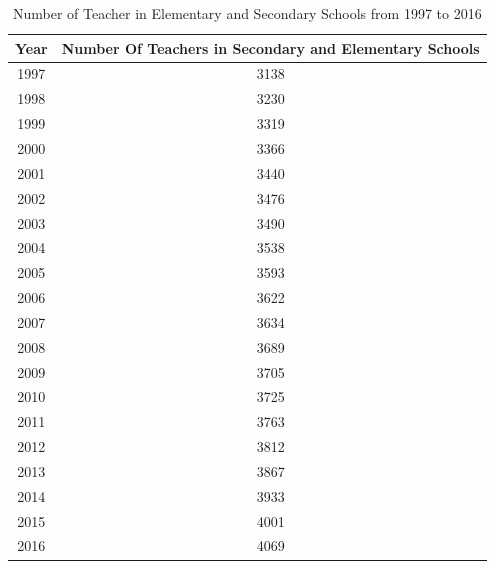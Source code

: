 \documentclass[thesis=B,english]{FITthesis}[2012/10/20]
\begin{document}
\newpage
\begin{table}[H]
\def\arraystretch{1.7}%
\captionsetup{justification=centering}
\begin{tabular}{|c|c|}
\hline
\textbf{Year} & \textbf{Number Of Teachers in Secondary and Elementary Schools} \\ \hline
1997          & 3138                                                            \\ \hline
1998          & 3230                                                            \\ \hline
1999          & 3319                                                            \\ \hline
2000          & 3366                                                            \\ \hline
2001          & 3440                                                            \\ \hline
2002          & 3476                                                            \\ \hline
2003          & 3490                                                            \\ \hline
2004          & 3538                                                            \\ \hline
2005          & 3593                                                            \\ \hline
2006          & 3622                                                            \\ \hline
2007          & 3634                                                            \\ \hline
2008          & 3689                                                            \\ \hline
2009          & 3705                                                            \\ \hline
2010          & 3725                                                            \\ \hline
2011          & 3763                                                            \\ \hline
2012          & 3812                                                            \\ \hline
2013          & 3867                                                            \\ \hline
2014          & 3933                                                            \\ \hline
2015          & 4001                                                            \\ \hline
2016          & 4069                                                            \\ \hline
\end{tabular}
\caption{Number of Teacher in Elementary and Secondary Schools from 1997 to 2016 \cite{tableteacher}}
\label{tab:teacher}
\end{table}
\end{document}
